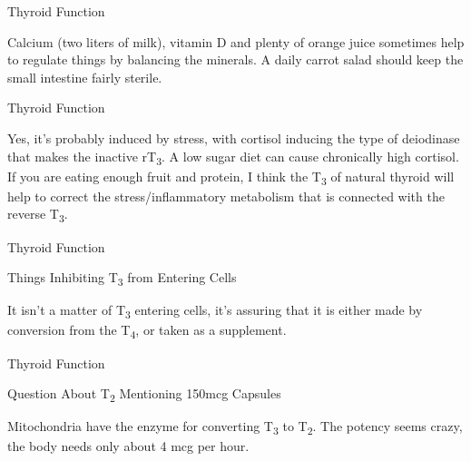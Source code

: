 \documentclass[11pt,oneside,openany,extrafontsizes]{memoir}
\begin{document}
\begin{standalonequote}{Thyroid Function}

    \begin{answer}
        Calcium (two liters of milk), vitamin D and plenty of orange juice sometimes help to regulate things by balancing the minerals. A daily carrot salad should keep the small intestine fairly sterile.
    \end{answer}
\end{standalonequote}

\begin{standalonequote}{Thyroid Function}

    \begin{answer}
        Yes, it's probably induced by stress, with cortisol inducing the type of deiodinase that makes the inactive rT\textsubscript{3}. A low sugar diet can cause chronically high cortisol. If you are eating enough fruit and protein, I think the T\textsubscript{3} of natural thyroid will help to correct the stress/inflammatory metabolism that is connected with the reverse T\textsubscript{3}.
    \end{answer}
\end{standalonequote}

\begin{standalonequote}{Thyroid Function}
    \begin{note}
        Things Inhibiting T\textsubscript{3} from Entering Cells
    \end{note}

    \begin{answer}
        It isn't a matter of T\textsubscript{3} entering cells, it's assuring that it is either made by conversion from the T\textsubscript{4}, or taken as a supplement.
    \end{answer}
\end{standalonequote}

\begin{standalonequote}{Thyroid Function}
    \begin{note}
        Question About T\textsubscript{2} Mentioning 150mcg Capsules
    \end{note}

    \begin{answer}
        Mitochondria have the enzyme for converting T\textsubscript{3} to T\textsubscript{2}. The potency seems crazy, the body needs only about 4 mcg per hour.
    \end{answer}
\end{standalonequote}
\end{document}
